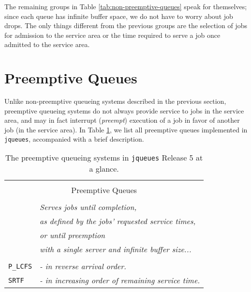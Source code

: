 The remaining groups
  in Table \ref{tab:non-preemptive-queues}
  speak for themselves;
  since each queue has infinite buffer space,
  we do not have to worry about job drops.
The only things different
  from the previous groups
  are the selection of jobs for admission
  to the service area
  or the time required
  to serve a job
  once admitted
  to the service area.
  
\section{Preemptive Queues}
\label{sec:preemptive-queues}

Unlike non-preemptive queueing systems
  described in the previous section,
  preemptive queueing systems
  do not always provide service to
  jobs in the service area,
  and may in fact interrupt ({\em preempt})
  execution of a job in favor of another job
  (in the service area).
In Table \ref{tab:preemptive-queues},
  we list all preemptive queues implemented in
  \lstinline|jqueues|, accompanied with a brief
  description.

\begin{table}[!htbp]
	\label{tab:preemptive-queues}
	\caption{The preemptive queueing systems
             in \texttt{jqueues} Release 5
             at a glance.}
	\begin{center}
		\begin{tabular}{|l|l|}
			\hline
			\multicolumn{2}{|c|}{} \\
			\multicolumn{2}{|c|}{Preemptive Queues} \\
			\multicolumn{2}{|c|}{} \\
			\hline
            \hline
              &
              {\em Serves jobs until completion,}
              \\
              &
              {\em as defined by the jobs'
                   requested service times,}
              \\
              &
              {\em or until preemption}
              \\
              &
              {\em with a single server
                   and infinite buffer size...}
              \\
              &
              \\
			\lstinline|P_LCFS|
              &
              {\em - in reverse arrival order.}
              \\
			\lstinline|SRTF|
              &
              {\em - in increasing order of
                     remaining service time.}
              \\
            \hline
		\end{tabular}
	\end{center}
\end{table}

